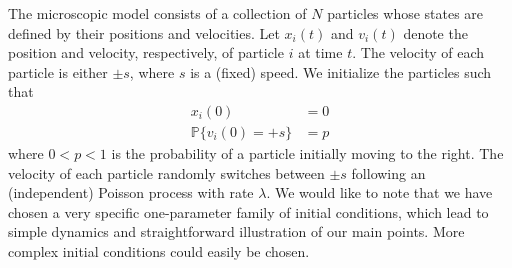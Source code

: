 \documentclass[prl, reprint]{revtex4-1}
\begin{document}
The microscopic model consists of a collection of $N$ particles whose states are defined by their positions and velocities. 
%
Let $x_i(t)$ and $v_i(t)$ denote the position and velocity, respectively, of particle $i$ at time $t$.
%
The velocity of each particle is either $\pm s$, where $s$ is a (fixed) speed. 
%
We initialize the particles such that
\begin{equation}\label{eqn:system}
\begin{aligned}
x_i(0) & = 0 \\
\mathbb{P} \{ v_i(0) = +s \} & = p
\end{aligned}
\end{equation}
where $0 < p < 1$ is the probability of a particle initially moving to the right.
%
The velocity of each particle randomly switches between $\pm s$ following an (independent) Poisson process with rate $\lambda$.
%
We would like to note that we have chosen a very specific one-parameter family of initial conditions, which lead to simple dynamics and straightforward illustration of our main points.
%
More complex initial conditions could easily be chosen. 
\end{document}
